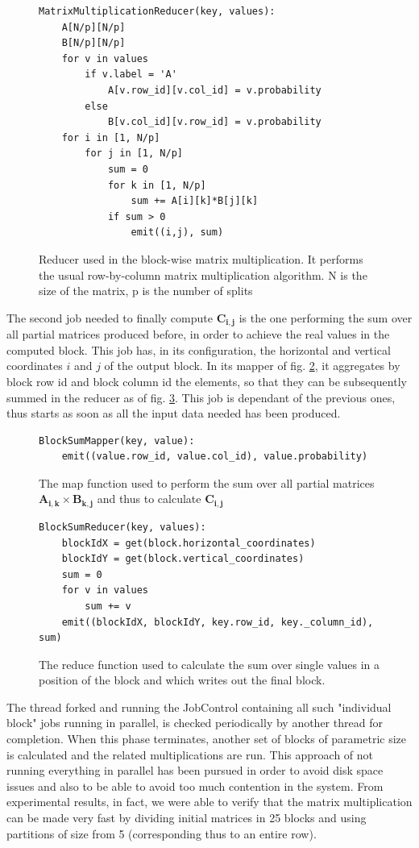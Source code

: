 \begin{figure}
\begin{verbatim}
MatrixMultiplicationReducer(key, values):
    A[N/p][N/p]
    B[N/p][N/p]
    for v in values
        if v.label = 'A'
            A[v.row_id][v.col_id] = v.probability
        else
            B[v.col_id][v.row_id] = v.probability
    for i in [1, N/p]
        for j in [1, N/p]
            sum = 0
            for k in [1, N/p]
                sum += A[i][k]*B[j][k]
            if sum > 0
                emit((i,j), sum)
\end{verbatim}
\caption{Reducer used in the block-wise matrix multiplication. It performs the usual row-by-column matrix multiplication algorithm. N is the size of the matrix, p is the number of splits}
\label{fig:blockwisereduce}
\end{figure}
The second job needed to finally compute $\mathbf{C_{i,j}}$ is the one performing the sum over all partial matrices produced before, in order to achieve the real values in the computed block.
This job has, in its configuration, the horizontal and vertical coordinates $i$ and $j$ of the output block. In its mapper of fig. \ref{fig:blocksummap}, it aggregates by block row id and block column id the elements, so that they can be subsequently summed in the reducer as of fig. \ref{fig:blocksumreduce}.
This job is dependant of the previous ones, thus starts as soon as all the input data needed has been produced.
\begin{figure}
\begin{verbatim}
BlockSumMapper(key, value):
    emit((value.row_id, value.col_id), value.probability)
\end{verbatim}
\caption{The map function used to perform the sum over all partial matrices $\mathbf{A_{i,k}} \times \mathbf{B_{k,j}}$ and thus to calculate $\mathbf{C_{i,j}}$}
\label{fig:blocksummap}
\end{figure}
\begin{figure}
\begin{verbatim}
BlockSumReducer(key, values):
    blockIdX = get(block.horizontal_coordinates)
    blockIdY = get(block.vertical_coordinates)
    sum = 0
    for v in values
        sum += v
    emit((blockIdX, blockIdY, key.row_id, key._column_id), sum)
\end{verbatim}
\caption{The reduce function used to calculate the sum over single values in a position of the block and which writes out the final block.}
\label{fig:blocksumreduce}
\end{figure}
The thread forked and running the JobControl containing all such "individual block" jobs running in parallel, is checked periodically by another thread for completion. When this phase terminates, another set of blocks of parametric size
is calculated and the related multiplications are run.
This approach of not running everything in parallel has been pursued in order to avoid disk space issues and also to be 
able to avoid too much contention in the system.
From experimental results, in fact, we were able to verify that the matrix multiplication can be made very fast by dividing
initial matrices in 25 blocks and using partitions of size from 5 (corresponding thus to an entire row).

